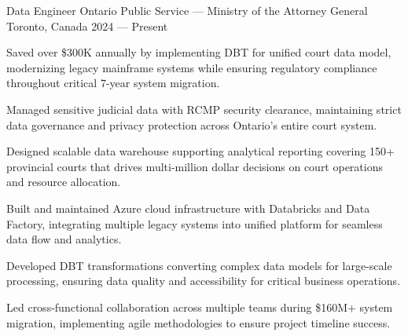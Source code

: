 
\begin{cventries}

\cventry%
 {Data Engineer}
 {Ontario Public Service --- Ministry of the Attorney General}
 {Toronto, Canada}
 {2024 --- Present}
 {
	\begin{cvitems}
		\item Saved over \$300K annually by implementing DBT for unified court data model, modernizing legacy mainframe systems while ensuring regulatory compliance throughout critical 7-year system migration.
		\item Managed sensitive judicial data with RCMP security clearance, maintaining strict data governance and privacy protection across Ontario's entire court system.
		\item Designed scalable data warehouse supporting analytical reporting covering 150+ provincial courts that drives multi-million dollar decisions on court operations and resource allocation.
		\item Built and maintained Azure cloud infrastructure with Databricks and Data Factory, integrating multiple legacy systems into unified platform for seamless data flow and analytics.
		\item Developed DBT transformations converting complex data models for large-scale processing, ensuring data quality and accessibility for critical business operations.
		\item Led cross-functional collaboration across multiple teams during \$160M+ system migration, implementing agile methodologies to ensure project timeline success.
	\end{cvitems}
 }


\end{cventries}
